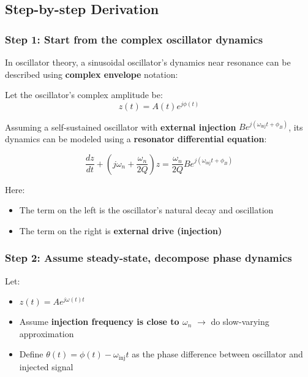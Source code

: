 \documentclass{article}
\begin{document}
\subsection{Step-by-step Derivation}

\subsubsection{Step 1: Start from the complex oscillator dynamics}

In oscillator theory, a sinusoidal oscillator's dynamics near resonance can be described using \textbf{complex envelope} notation:

Let the oscillator's complex amplitude be:
\begin{equation}
z(t) = A(t) e^{j\phi(t)}
\end{equation}

Assuming a self-sustained oscillator with \textbf{external injection} $B e^{j(\omega_{\text{inj}} t + \phi_B)}$, its dynamics can be modeled using a \textbf{resonator differential equation}:

\begin{equation}
\frac{dz}{dt} + \left(j\omega_n + \frac{\omega_n}{2Q}\right) z = \frac{\omega_n}{2Q} B e^{j(\omega_{\text{inj}} t + \phi_B)}
\end{equation}

Here:
\begin{itemize}
    \item The term on the left is the oscillator's natural decay and oscillation
    \item The term on the right is \textbf{external drive (injection)}
\end{itemize}

\subsubsection{Step 2: Assume steady-state, decompose phase dynamics}

Let:
\begin{itemize}
    \item $z(t) = A e^{j\omega(t)t}$
    \item Assume \textbf{injection frequency is close to $\omega_n$} $\rightarrow$ do slow-varying approximation
    \item Define $\theta(t) = \phi(t) - \omega_{\text{inj}} t$ as the phase difference between oscillator and injected signal
\end{itemize}
\end{document}
